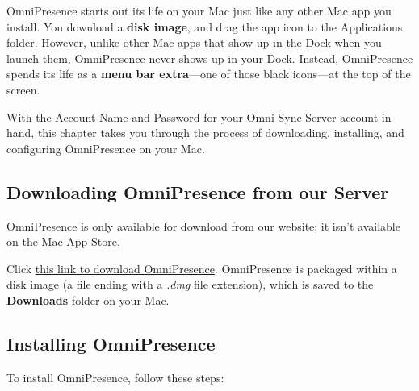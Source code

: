 \documentclass[../main.tex]{subfiles}
\begin{document}
OmniPresence starts out its life on your Mac just like any other Mac app you install. You
download a \textbf{disk image}, and drag the app icon to the Applications folder. However,
unlike other Mac apps that show up in the Dock when you launch them, OmniPresence never shows
up in your Dock. Instead, OmniPresence spends its life as a \textbf{menu bar extra}---one of
those black icons---at the top of the screen.

With the Account Name and Password for your Omni Sync Server account in-hand, this chapter takes
you through the process of downloading, installing, and configuring OmniPresence on your Mac.

\subsection{Downloading OmniPresence from our Server}

OmniPresence is only available for download from our website; it isn't available on the Mac App
Store.

Click \href{http://www.omnigroup.com/download/latest/omnipresence}{this link to download
OmniPresence}. OmniPresence is packaged within a disk image (a file ending with a
\textit{.dmg} file extension), which is saved to the \textbf{Downloads} folder on your Mac.


\subsection{Installing OmniPresence}

To install OmniPresence, follow these steps:
\end{document}
